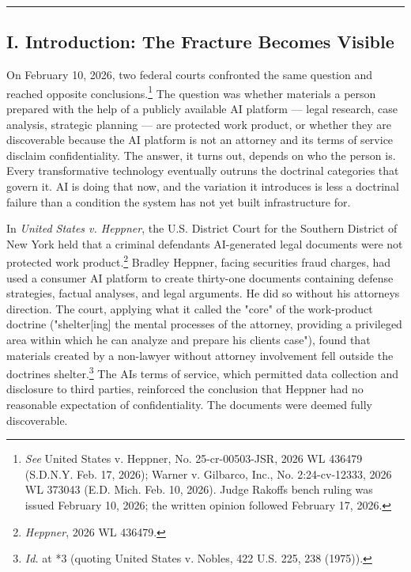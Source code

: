\documentclass[
  12pt,
]{article}
\begin{document}
\begin{center}\rule{0.5\linewidth}{0.5pt}\end{center}

\subsection{I. Introduction: The Fracture Becomes
Visible}\label{i-introduction-the-fracture-becomes-visible}

On February 10, 2026, two federal courts confronted the same question and
reached opposite conclusions.\footnote{\emph{See} United States v.
  Heppner, No. 25-cr-00503-JSR, 2026 WL 436479 (S.D.N.Y. Feb. 17, 2026);
  Warner v. Gilbarco, Inc., No. 2:24-cv-12333, 2026 WL 373043 (E.D.
  Mich. Feb. 10, 2026). Judge Rakoff\textquotesingle s bench ruling was
  issued February 10, 2026; the written opinion followed February 17,
  2026.} The question was whether materials a person prepared with the
help of a publicly available AI platform --- legal research, case
analysis, strategic planning --- are protected work product, or whether
they are discoverable because the AI platform is not an attorney and its
terms of service disclaim confidentiality. The answer, it turns out,
depends on who the person is. Every transformative technology eventually
outruns the doctrinal categories that govern it. AI is doing that now,
and the variation it introduces is less a doctrinal failure than a
condition the system has not yet built infrastructure for.

In \emph{United States v. Heppner}, the U.S. District Court for the
Southern District of New York held that a criminal
defendant\textquotesingle s AI-generated legal documents were not
protected work product.\footnote{\emph{Heppner}, 2026 WL 436479.}
Bradley Heppner, facing securities fraud charges, had used a consumer AI
platform to create thirty-one documents containing defense strategies,
factual analyses, and legal arguments. He did so without his
attorney\textquotesingle s direction. The court, applying what it called
the "core" of the work-product doctrine ("shelter{[}ing{]} the mental
processes of the attorney, providing a privileged area within which he
can analyze and prepare his client\textquotesingle s case"), found that
materials created by a non-lawyer without attorney involvement fell
outside the doctrine\textquotesingle s shelter.\footnote{\emph{Id.} at
  *3 (quoting United States v. Nobles, 422 U.S. 225, 238 (1975)).} The
AI\textquotesingle s terms of service, which permitted data collection
and disclosure to third parties, reinforced the conclusion that Heppner
had no reasonable expectation of confidentiality. The documents were
deemed fully discoverable.
\end{document}
